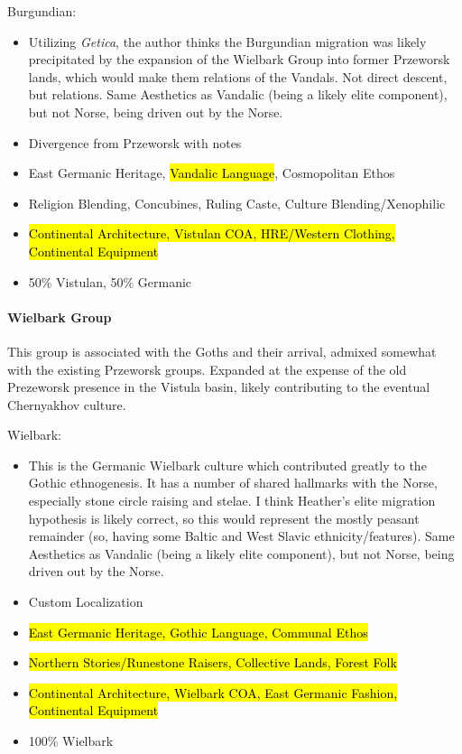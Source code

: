 \documentclass{article}
\begin{document}
	Burgundian:
	\begin{itemize}
		\item Utilizing \textit{Getica}, the author thinks the Burgundian migration was likely precipitated by the expansion of the Wielbark Group into former Przeworsk lands, which would make them relations of the Vandals.
		Not direct descent, but relations.
		Same Aesthetics as Vandalic (being a likely elite component), but not Norse, being driven out by the Norse.
		\item Divergence from Przeworsk with notes
		\item East Germanic Heritage, \hl{Vandalic Language}, Cosmopolitan Ethos
		\item Religion Blending, Concubines, Ruling Caste, Culture Blending/Xenophilic
		\item \hl{Continental Architecture, Vistulan COA, HRE/Western Clothing, Continental Equipment}
		\item 50\% Vistulan, 50\% Germanic
	\end{itemize}
	
	\paragraph{Wielbark Group}
	This group is associated with the Goths and their arrival, admixed somewhat with the existing Przeworsk groups.
	Expanded at the expense of the old Prezeworsk presence in the Vistula basin, likely contributing to the eventual Chernyakhov culture.
	
	Wielbark:
	\begin{itemize}
		\item This is the Germanic Wielbark culture which contributed greatly to the Gothic ethnogenesis.
		It has a number of shared hallmarks with the Norse, especially stone circle raising and stelae.
		I think Heather’s elite migration hypothesis is likely correct, so this would represent the mostly peasant remainder (so, having some Baltic and West Slavic ethnicity/features).
		Same Aesthetics as Vandalic (being a likely elite component), but not Norse, being driven out by the Norse.
		\item Custom Localization
		\item \hl{East Germanic Heritage, Gothic Language, Communal Ethos}
		\item \hl{Northern Stories/Runestone Raisers, Collective Lands, Forest Folk}
		\item \hl{Continental Architecture, Wielbark COA, East Germanic Fashion, Continental Equipment}
		\item 100\% Wielbark
	\end{itemize}
	
\end{document}
